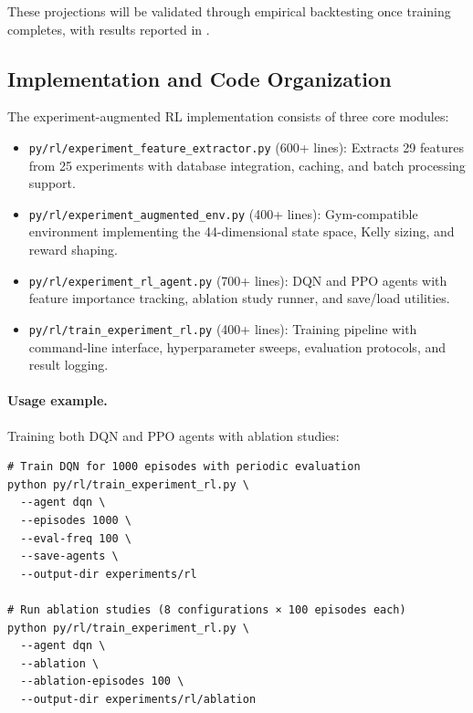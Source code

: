 These projections will be validated through empirical backtesting once training completes, with results reported in .

\subsection{Implementation and Code Organization}

The experiment-augmented RL implementation consists of three core modules:

\begin{itemize}
  \item \texttt{py/rl/experiment\_feature\_extractor.py} (600+ lines): Extracts 29 features from 25 experiments with database integration, caching, and batch processing support.
  \item \texttt{py/rl/experiment\_augmented\_env.py} (400+ lines): Gym-compatible environment implementing the 44-dimensional state space, Kelly sizing, and reward shaping.
  \item \texttt{py/rl/experiment\_rl\_agent.py} (700+ lines): DQN and PPO agents with feature importance tracking, ablation study runner, and save/load utilities.
  \item \texttt{py/rl/train\_experiment\_rl.py} (400+ lines): Training pipeline with command-line interface, hyperparameter sweeps, evaluation protocols, and result logging.
\end{itemize}

\paragraph{Usage example.}
Training both DQN and PPO agents with ablation studies:
\begin{verbatim}
# Train DQN for 1000 episodes with periodic evaluation
python py/rl/train_experiment_rl.py \
  --agent dqn \
  --episodes 1000 \
  --eval-freq 100 \
  --save-agents \
  --output-dir experiments/rl

# Run ablation studies (8 configurations × 100 episodes each)
python py/rl/train_experiment_rl.py \
  --agent dqn \
  --ablation \
  --ablation-episodes 100 \
  --output-dir experiments/rl/ablation
\end{verbatim}

